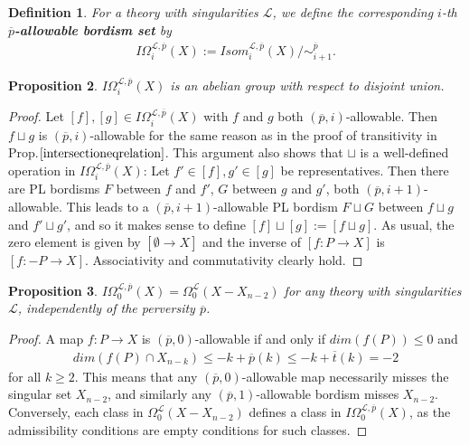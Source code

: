 \documentclass{scrreprt}
\newtheorem{prop}{Proposition}[chapter]
\newtheorem{definition}[prop]{Definition}
\begin{document}
\begin{definition}
For a theory with singularities $\mathcal{L}$, we define the corresponding $i$-th $\overline{p}$\textbf{-allowable bordism set} by 
\begin{align*}
I \Omega_i^{\mathcal{L}, \overline{p}}(X) := Isom_i^{\mathcal{L}, \overline{p}}(X)/ \sim_{i+1}^{\overline{p}} .
\end{align*}
\end{definition}

\begin{prop}
$I \Omega_i^{\mathcal{L}, \overline{p}}(X) $ is an abelian group with respect to disjoint union.
\end{prop}

\begin{proof}
Let $[f],[g] \in I \Omega_i^{\mathcal{L}, \overline{p}}(X) $ with $f$ and $g$ both $(\overline{p},i)$-allowable. Then $f \sqcup g$ is $(\overline{p},i)$-allowable for the same reason as in the proof of transitivity in Prop.$\ref{intersectioneqrelation}$. This argument also shows that $\sqcup$ is a well-defined operation in $I \Omega_i^{\mathcal{L}, \overline{p}}(X)$: Let $f' \in [f],g' \in [g]$ be representatives. Then there are PL bordisms $F$ between $f$ and $f'$, $G$ between $g$ and $g'$, both $(\overline{p},i+1)$-allowable. This leads to a $(\overline{p},i+1)$-allowable PL bordism $F \sqcup G$ between $f \sqcup g$ and $f' \sqcup g'$, and so it makes sense to define $[f] \sqcup [g]:=[f \sqcup g]$. As usual, the zero element is given by $[\emptyset \to X]$ and the inverse of $[f: P \to X]$ is $[f: -P \to X]$. Associativity and commutativity clearly hold.
\end{proof}

\begin{prop}\label{Iomegazero}
$I \Omega_0^{\mathcal{L}, \overline{p}}(X)= \Omega_0^{\mathcal{L}}(X-X_{n-2})$ for any theory with singularities $\mathcal{L}$, independently of the perversity $\overline{p}$.
\end{prop}

\begin{proof}
A map $f:P \to X$ is $(\overline{p},0)$-allowable if and only if $dim(f(P)) \leq 0$ and
\begin{align*}
 dim(f(P) \cap X_{n-k}) \leq -k+\overline{p}(k) \leq -k+ \overline{t}(k) =-2
\end{align*} for all $k \geq 2$. This means that any $(\overline{p},0)$-allowable map necessarily misses the singular set $X_{n-2}$, and similarly any $(\overline{p},1)$-allowable bordism misses $X_{n-2}$. Conversely, each class in $ \Omega_0^{\mathcal{L}}(X-X_{n-2})$ defines a class in $I \Omega_0^{\mathcal{L}, \overline{p}}(X)$, as the admissibility conditions are empty conditions for such classes.
\end{proof}
\end{document}
